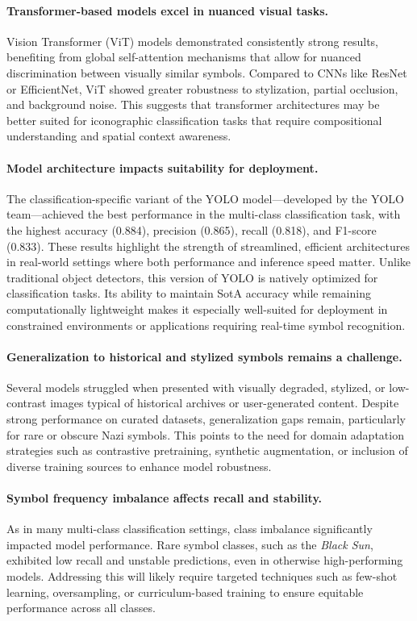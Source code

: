 \paragraph{Transformer-based models excel in nuanced visual tasks.}
Vision Transformer (\ac{ViT}) models demonstrated consistently strong results, benefiting from global
self-attention mechanisms that allow for nuanced discrimination between visually similar symbols. Compared to \ac{CNN}s
like ResNet or EfficientNet, \ac{ViT} showed greater robustness to stylization, partial occlusion, and background noise.
This suggests that transformer architectures may be better suited for iconographic classification tasks that require
compositional understanding and spatial context awareness.

\paragraph{Model architecture impacts suitability for deployment.}
The classification-specific variant of the YOLO model—developed by the YOLO team—achieved the best performance in
the multi-class classification task, with the highest accuracy (0.884), precision (0.865), recall (0.818), and
F1-score (0.833). These results highlight the strength of streamlined, efficient architectures in real-world
settings where both performance and inference speed matter. Unlike traditional object detectors, this version of
YOLO is natively optimized for classification tasks. Its ability to maintain \ac{SotA} accuracy while
remaining computationally lightweight makes it especially well-suited for deployment in constrained environments or
applications requiring real-time symbol recognition.

\paragraph{Generalization to historical and stylized symbols remains a challenge.}
Several models struggled when presented with visually degraded, stylized, or low-contrast images typical of
historical archives or user-generated content. Despite strong performance on curated datasets, generalization gaps
remain, particularly for rare or obscure Nazi symbols. This points to the need for domain adaptation strategies such
as contrastive pretraining, synthetic augmentation, or inclusion of diverse training sources to enhance model
robustness.

\paragraph{Symbol frequency imbalance affects recall and stability.}
As in many multi-class classification settings, class imbalance significantly impacted model performance. Rare
symbol classes, such as the \textit{Black Sun}, exhibited low recall and unstable predictions,
even in otherwise high-performing models. Addressing this will likely require targeted techniques such as few-shot
learning, oversampling, or curriculum-based training to ensure equitable performance across all classes.

